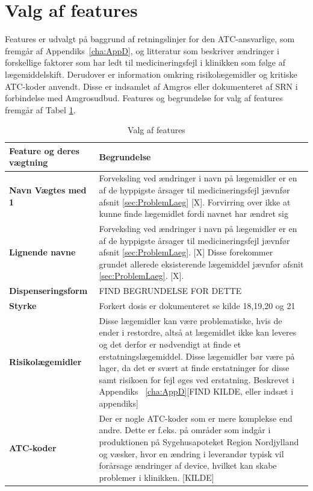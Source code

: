 \section{Valg af features}
Features er udvalgt på baggrund af retningslinjer for den ATC-ansvarlige, som fremgår af Appendiks~\ref{cha:AppD}, og litteratur som beskriver ændringer i forskellige faktorer som har ledt til medicineringsfejl i klinikken som følge af lægemiddelskift. Derudover er information omkring risikolægemidler og kritiske ATC-koder anvendt. Disse er indsamlet af Amgros eller dokumenteret af SRN i forbindelse med Amgrosudbud. Features og begrundelse for valg af features fremgår af Tabel \ref{table:features}.

\begin{longtable}{p{3.5cm}| p{10.5cm}}
	\caption{Valg af features}
	\label{table:features} \\
\cellcolor[HTML]{C0C0C0} {\textbf{Feature og deres vægtning}} & \cellcolor[HTML]{C0C0C0} {\textbf{Begrundelse}}  \\ \hline
\textbf{Navn  \newline Vægtes med 1} &  Forveksling ved ændringer i navn på lægemidler er en af de hyppigste årsager til medicineringsfejl jævnfør afsnit \ref{sec:ProblemLaeg} [X]. Forvirring over ikke at kunne finde lægemidlet fordi navnet har ændret sig \\  \hline 
\textbf{Lignende navne} &  Forveksling ved ændringer i navn på lægemidler er en af de hyppigste årsager til medicineringsfejl jævnfør afsnit \ref{sec:ProblemLaeg}. [X] Disse forekommer grundet allerede eksisterende lægemiddel jævnfør afsnit \ref{sec:ProblemLaeg}. [X]. \\  \hline 
\textbf{Dispenseringsform} &  FIND BEGRUNDELSE FOR DETTE  \\ \hline 
\textbf{Styrke} &  Forkert dosis er dokumenteret se kilde 18,19,20 og 21  \\ \hline
\textbf{Risikolægemidler} & Disse lægemidler kan være problematiske, hvis de ender i restordre, altså at lægemidlet ikke kan leveres og det derfor er nødvendigt at finde et erstatningslægemiddel. Disse lægemidler bør være på lager, da det er svært at finde erstatninger for disse samt risikoen for fejl øges ved erstatning. Beskrevet i Appendiks ~\ref{cha:AppD}[FIND KILDE, eller indsæt i appendiks]  \\ \hline 
\textbf{ATC-koder} &  Der er nogle ATC-koder som er mere komplekse end andre. Dette er f.eks. på områder som indgår i produktionen på Sygehusapoteket Region Nordjylland og væsker, hvor en ændring i leverandør typisk vil forårsage ændringer af device, hvilket kan skabe problemer i klinikken. [KILDE] \\ \hline 

\end{longtable}
